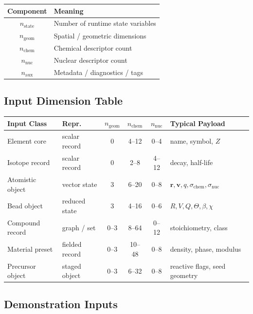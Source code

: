 \documentclass[11pt, a4paper, oneside]{article}
\begin{document}
\begin{center}
\begin{tabular}{@{} cl @{}}
\toprule
\textbf{Component} & \textbf{Meaning}\\
\midrule
$n_{\text{state}}$ & Number of runtime state variables\\
$n_{\text{geom}}$  & Spatial / geometric dimensions\\
$n_{\text{chem}}$  & Chemical descriptor count\\
$n_{\text{nuc}}$   & Nuclear descriptor count\\
$n_{\text{aux}}$   & Metadata / diagnostics / tags\\
\bottomrule
\end{tabular}
\end{center}

\subsection{Input Dimension Table}
\label{sec:dim_table}

\begin{center}
\small
\begin{tabular}{@{} l l c c c l @{}}
\toprule
\textbf{Input Class} & \textbf{Repr.} & $n_{\text{geom}}$
  & $n_{\text{chem}}$ & $n_{\text{nuc}}$ & \textbf{Typical Payload}\\
\midrule
Element core      & scalar record  & 0   & 4--12  & 0--4   & name, symbol, $Z$\\
Isotope record    & scalar record  & 0   & 2--8   & 4--12  & decay, half-life\\
Atomistic object  & vector state   & 3   & 6--20  & 0--8   & $\bm{r},\bm{v},q,\sigma_{\text{chem}},\sigma_{\text{nuc}}$\\
Bead object       & reduced state  & 3   & 4--16  & 0--6   & $R,V,Q,\Theta,\beta,\chi$\\
Compound record   & graph / set    & 0--3 & 8--64  & 0--12  & stoichiometry, class\\
Material preset   & fielded record & 0--3 & 10--48 & 0--8   & density, phase, modulus\\
Precursor object  & staged object  & 0--3 & 6--32  & 0--8   & reactive flags, seed geometry\\
\bottomrule
\end{tabular}
\end{center}

\subsection{Demonstration Inputs}
\end{document}
